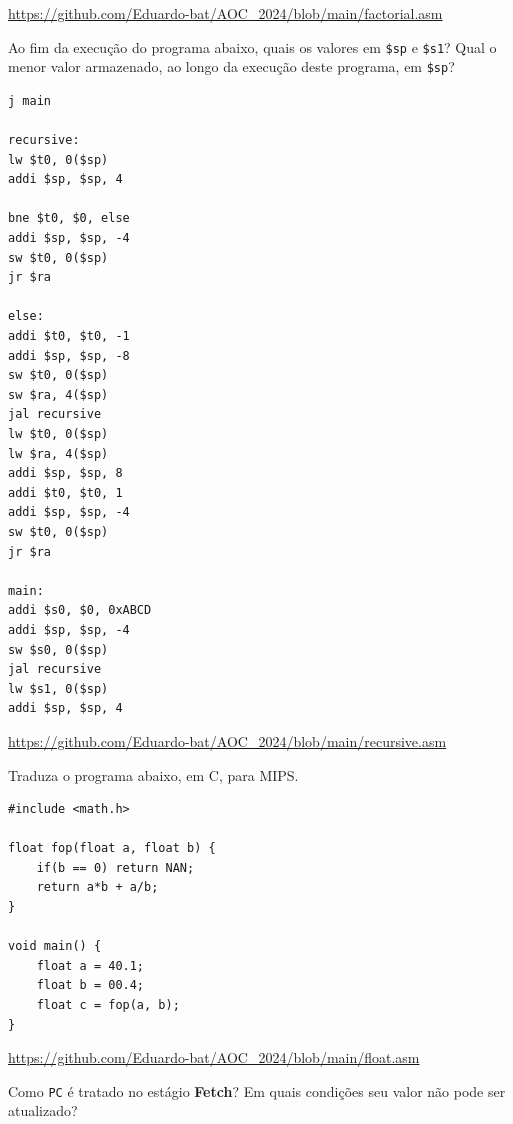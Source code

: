 \documentclass{article}
\begin{document}
\url{https://github.com/Eduardo-bat/AOC_2024/blob/main/factorial.asm}

\pagebreak

Ao fim da execução do programa abaixo, quais os valores em \verb|$sp| e \verb|$s1|?  Qual o menor valor armazenado, ao longo da execução deste programa, em \verb|$sp|?

\begin{center}
    \begin{minipage}{0.35\textwidth}
        \begin{lstlisting}[frame=single]
j main

recursive:
lw $t0, 0($sp)
addi $sp, $sp, 4

bne $t0, $0, else
addi $sp, $sp, -4
sw $t0, 0($sp)
jr $ra

else:
addi $t0, $t0, -1
addi $sp, $sp, -8
sw $t0, 0($sp)
sw $ra, 4($sp)
jal recursive
lw $t0, 0($sp)
lw $ra, 4($sp)
addi $sp, $sp, 8
addi $t0, $t0, 1
addi $sp, $sp, -4
sw $t0, 0($sp)
jr $ra

main:
addi $s0, $0, 0xABCD
addi $sp, $sp, -4
sw $s0, 0($sp)
jal recursive
lw $s1, 0($sp)
addi $sp, $sp, 4
        \end{lstlisting}
    \end{minipage}
\end{center}

\url{https://github.com/Eduardo-bat/AOC_2024/blob/main/recursive.asm}

\pagebreak

Traduza o programa abaixo, em C, para MIPS.

\begin{center}
    \begin{minipage}{0.475\textwidth}
        \begin{lstlisting}[frame=single]
#include <math.h>

float fop(float a, float b) {
    if(b == 0) return NAN;
    return a*b + a/b;
}

void main() {
    float a = 40.1;
    float b = 00.4;
    float c = fop(a, b);
}
        \end{lstlisting}
    \end{minipage}
\end{center}

\url{https://github.com/Eduardo-bat/AOC_2024/blob/main/float.asm}

\bigbreak
\normalsize

{\large Como \verb|PC| é tratado no estágio \textbf{Fetch}? Em quais condições seu valor não pode ser atualizado?\vspace{1mm}}
\end{document}

